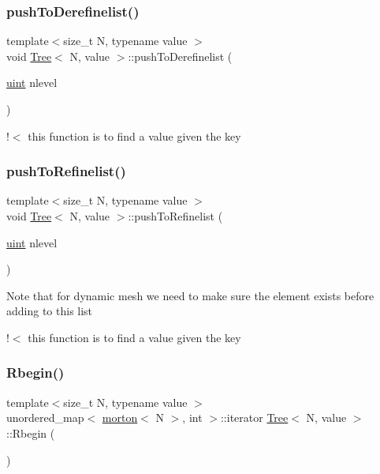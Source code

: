 \mbox{\label{classTree_a52c75138e39fc5ee1cb034b3ef3d9b97}} 
\subsubsection{\texorpdfstring{push\+To\+Derefinelist()}{pushToDerefinelist()}}
{\footnotesize\ttfamily template$<$size\+\_\+t N, typename value $>$ \\
void \mbox{\hyperlink{classTree}{Tree}}$<$ N, value $>$\+::push\+To\+Derefinelist (\begin{DoxyParamCaption}\item[{\mbox{\hyperlink{definitions_8h_a69aa29b598b851b0640aa225a9e5d61d}{uint}}}]{nlevel }\end{DoxyParamCaption})}

!$<$ this function is to find a value given the key \mbox{\label{classTree_a9ba1d0e46c90f677fb33480f3061624b}} 
\subsubsection{\texorpdfstring{push\+To\+Refinelist()}{pushToRefinelist()}}
{\footnotesize\ttfamily template$<$size\+\_\+t N, typename value $>$ \\
void \mbox{\hyperlink{classTree}{Tree}}$<$ N, value $>$\+::push\+To\+Refinelist (\begin{DoxyParamCaption}\item[{\mbox{\hyperlink{definitions_8h_a69aa29b598b851b0640aa225a9e5d61d}{uint}}}]{nlevel }\end{DoxyParamCaption})}

Note that for dynamic mesh we need to make sure the element exists before adding to this list

!$<$ this function is to find a value given the key \mbox{\label{classTree_aac90381448bee888a44fb8089023d0d8}} 
\subsubsection{\texorpdfstring{Rbegin()}{Rbegin()}}
{\footnotesize\ttfamily template$<$size\+\_\+t N, typename value $>$ \\
unordered\+\_\+map$<$ \mbox{\hyperlink{definitions_8h_af8682350bd8bb38ee9023f7a0a310add}{morton}}$<$ N $>$, int $>$\+::iterator \mbox{\hyperlink{classTree}{Tree}}$<$ N, value $>$\+::Rbegin (\begin{DoxyParamCaption}{ }\end{DoxyParamCaption})}

